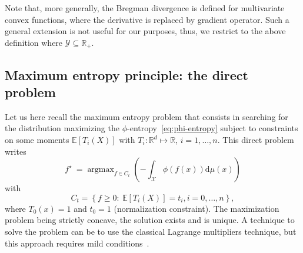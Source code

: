 \documentclass[english,sort&compress]{elsarticle}
\theoremstyle{definition}
\theoremstyle{plain}
\theoremstyle{plain}
\def\dmu{\mathrm{d}\mu}
\def\Rset{\mathbb{R}}
\def\X{\mathcal{X}}
\def\Y{\mathcal{Y}}
\DeclareMathOperator*{\argmax}{\operatorname{argmax}}
\newcommand{\Esp}[1]{\mathbb{E}\left[ #1 \right]}
\begin{document}
Note that,  more generally, the  Bregman divergence is defined  for multivariate
convex functions, where the derivative  is replaced by gradient operator. Such a
general extension  is not  useful for  our purposes, thus,  we restrict  to the
above definition where $\Y \subseteq \Rset_+$.



\subsection{Maximum entropy principle: the direct problem}

Let us  here recall the maximum  entropy problem that consists  in searching for
the distribution maximizing the $\phi$-entropy~\eqref{eq:phi-entropy} subject to
constraints on  some moments $\Esp{T_i(X)}$  with $T_i: \Rset^d  \mapsto \Rset$,
$i=1,\ldots,n$. This direct problem writes
%
\begin{equation}\label{eq:MaxEnt}
\displaystyle f^\star \: = \argmax_{f \in C_t} \left( - \int_\X \phi(f(x))
\dmu(x) \right)
\end{equation}
%
with
%
\begin{equation}\label{eq:Ct}
C_t = \left\{ f \ge 0: \: \Esp{T_i(X)} = t_i, i=0,\ldots,n\right\},
\end{equation}
%
where $T_0(x) =  1$ and $t_0 = 1$  (normalization constraint).  The maximization
problem being strictly concave, the  solution exists and is unique.  A technique
to solve the problem can be to use the classical Lagrange multipliers technique,
but   this  approach   requires  mild   conditions~\cite{KesKap89,  BorLew91:03,
  BorLew93,  BenBor92, TebVaj93, Gir97}.   
\end{document}
